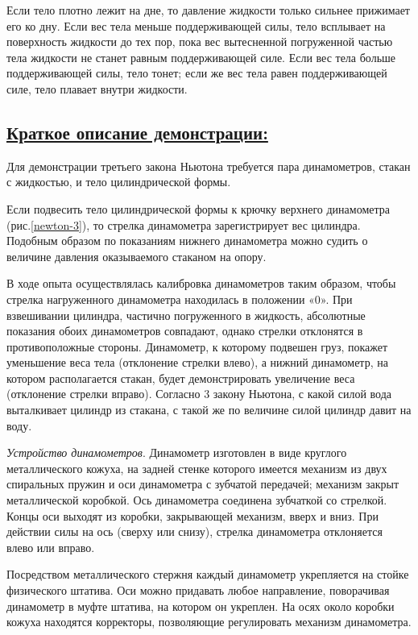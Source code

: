 \documentclass[14pt,a4paper,oneside]{extarticle}	%
\begin{document}
Если тело плотно лежит на дне, то давление жидкости только сильнее прижимает его ко дну. 
Если вес тела меньше поддерживающей силы, тело всплывает на поверхность жидкости до тех пор, пока вес вытесненной погруженной частью тела жидкости не станет равным поддерживающей силе. 
Если вес тела больше поддерживающей силы, тело тонет; если же вес тела равен поддерживающей силе, тело плавает внутри жидкости.

\subsection*{\underline{Краткое описание демонстрации:}}

Для демонстрации третьего закона Ньютона требуется пара динамометров, стакан с жидкостью, и тело цилиндрической формы.

Если подвесить тело цилиндрической формы к крючку верхнего динамометра (рис.\ref{newton-3}), то стрелка динамометра зарегистрирует вес цилиндра.
Подобным образом по показаниям нижнего динамометра можно судить о величине давления оказываемого стаканом на опору.

В ходе опыта осуществлялась калибровка динамометров таким образом, чтобы стрелка нагруженного динамометра находилась в положении «0».
При взвешивании цилиндра, частично погруженного в жидкость, абсолютные показания обоих динамометров совпадают, однако стрелки отклонятся в противоположные стороны.
Динамометр, к которому подвешен груз, покажет уменьшение веса тела (отклонение стрелки влево), а нижний динамометр, на котором располагается стакан, будет демонстрировать увеличение веса (отклонение стрелки вправо). Согласно 3 закону Ньютона, с какой силой вода выталкивает цилиндр из стакана, с такой же по величине силой цилиндр давит на воду.  

\textit{Устройство динамометров}. Динамометр изготовлен в виде круглого металлического кожуха, на задней стенке которого имеется механизм из двух спиральных пружин и оси динамометра с зубчатой передачей; механизм закрыт металлической коробкой.
Ось динамометра соединена зубчаткой со стрелкой. 
Концы оси выходят из коробки, закрывающей механизм, вверх и вниз.
При действии силы на ось (сверху или снизу), стрелка динамометра отклоняется влево или вправо.

Посредством металлического стержня каждый динамометр укрепляется на стойке физического штатива.
Оси можно придавать любое направление, поворачивая динамометр в муфте штатива, на котором он укреплен.
На осях около коробки кожуха находятся корректоры, позволяющие регулировать механизм динамометра.
\end{document}
